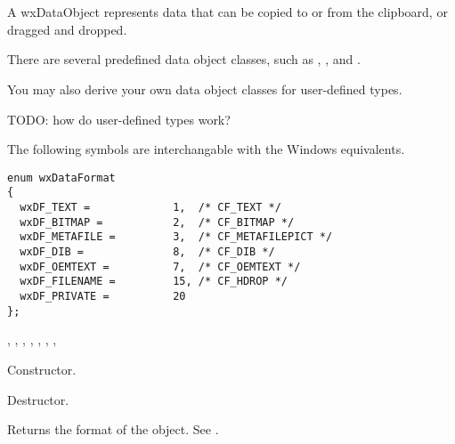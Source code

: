 \section{}\label{wxdataobject}

A wxDataObject represents data that can be copied to or from the clipboard, or
dragged and dropped.

There are several predefined data object classes, such as , 
, and .

You may also derive your own data object classes for user-defined types.

TODO: how do user-defined types work?




The following symbols are interchangable with the
Windows equivalents.

\begin{verbatim}
enum wxDataFormat
{
  wxDF_TEXT =             1,  /* CF_TEXT */
  wxDF_BITMAP =           2,  /* CF_BITMAP */
  wxDF_METAFILE =         3,  /* CF_METAFILEPICT */
  wxDF_DIB =              8,  /* CF_DIB */
  wxDF_OEMTEXT =          7,  /* CF_OEMTEXT */
  wxDF_FILENAME =         15, /* CF_HDROP */
  wxDF_PRIVATE =          20
};
\end{verbatim}


, 
, 
, 
, , 
, 
, 


\label{wxdataobjectwxdataobject}


Constructor.

\label{wxdataobjectdtor}


Destructor.

\label{wxdataobjectgetformat}


Returns the format of the object. See .

